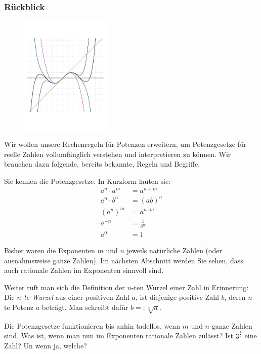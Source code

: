 \documentclass[%
11pt,%
twoside,%
titlepage,%
german,%
headsepline%
]{scrartcl}
\begin{document}
\subsubsection{Rückblick}
  \begin{figure}
  \begin{center}
    \includegraphics[width=0.382\textwidth]{pictures/title}
  \end{center}
\end{figure}
Wir wollen unsere Rechenregeln für Potenzen erweitern, um Potenzgesetze
für reelle Zahlen vollumfänglich verstehen und interpretieren zu können.
Wir brauchen dazu folgende, bereits bekannte, Regeln und Begriffe.
\begin{erin}
  Sie
  kennen die Potenzgesetze. In Kurzform lauten sie:
\begin{align}
  a^n\cdot a^m&=a^{n+m}\\
  a^n\cdot b^n&=(ab)^n\\
  \left(a^n\right)^m&=a^{n\cdot m}\\
  a^{-n}&=\frac{1}{a^n}\\
  a^0&=1
\end{align}

Bisher waren die Exponenten $m$ und $n$ jeweils natürliche Zahlen (oder ausnahmsweise ganze Zahlen). Im
nächsten Abschnitt werden Sie sehen, dass auch rationale Zahlen im Exponenten sinnvoll sind.

Weiter ruft man sich die Definition der $n$-ten Wurzel einer Zahl
in Erinnerung: Die \emph{$n$-te Wurzel} aus einer positiven Zahl
$a$, ist diejenige positive Zahl $b$, deren $n$-te Potenz $a$ beträgt.
Man schreibt dafür $b=:\sqrt[n]{a}$.
\end{erin}

Die Potenzgesetze funktionieren bis anhin tadellos, wenn $m$ und
$n$ ganze Zahlen sind. Was ist, wenn man nun im Exponenten rationale
Zahlen zulässt? Ist $3^{\frac{1}{2}}$ eine Zahl? Un wenn ja, welche?
\end{document}

